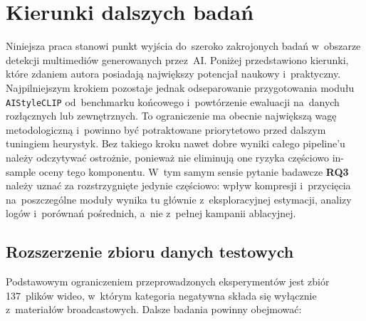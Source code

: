 \section{Kierunki dalszych bada\'{n}}

Niniejsza praca stanowi punkt wyj\'{s}cia do~szeroko zakrojonych bada\'{n}
w~obszarze detekcji multimedi\'{o}w generowanych przez~AI.
Poni\.{z}ej przedstawiono kierunki, kt\'{o}re zdaniem autora posiadaj\k{a}
najwi\k{e}kszy potencja\l{} naukowy i~praktyczny.
Najpilniejszym krokiem pozostaje jednak odseparowanie przygotowania modułu
\texttt{AIStyleCLIP} od~benchmarku końcowego i~powtórzenie ewaluacji na~danych
rozłącznych lub zewnętrznych. To ograniczenie ma obecnie największą wagę
metodologiczną i~powinno być potraktowane priorytetowo przed dalszym tuningiem heurystyk.
Bez takiego kroku nawet dobre wyniki całego pipeline'u należy odczytywać ostrożnie,
ponieważ nie eliminują one ryzyka częściowo in-sample oceny tego komponentu.
W~tym samym sensie pytanie badawcze \textbf{RQ3} należy uznać za rozstrzygnięte
jedynie częściowo: wpływ kompresji i~przycięcia na~poszczególne moduły wynika tu
głównie z~eksploracyjnej estymacji, analizy logów i~porównań pośrednich, a~nie
z~pełnej kampanii ablacyjnej.

\subsection{Rozszerzenie zbioru danych testowych}

Podstawowym ograniczeniem przeprowadzonych eksperyment\'{o}w
jest zbi\'{o}r 137~plik\'{o}w wideo, w~kt\'{o}rym kategoria negatywna
sk\l{}ada si\k{e} wy\l{}\k{a}cznie z~materia\l{}\'{o}w broadcastowych.
Dalsze badania powinny obejmowa\'{c}:

